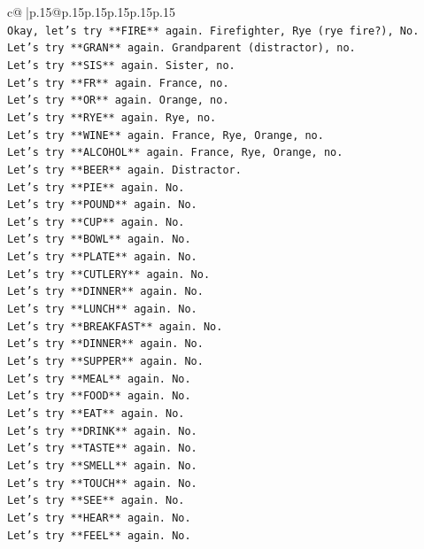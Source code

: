 \documentclass{article}
\begin{document}
{\begin{supertabular}{c@{$\;$}|p{.15\linewidth}@{}p{.15\linewidth}p{.15\linewidth}p{.15\linewidth}p{.15\linewidth}p{.15\linewidth}}
{{{\\ 
\texttt{Okay, let's try **FIRE** again. Firefighter, Rye (rye fire?), No.} \\
\texttt{Let's try **GRAN** again. Grandparent (distractor), no.} \\
\texttt{Let's try **SIS** again. Sister, no.} \\
\texttt{Let's try **FR** again. France, no.} \\
\texttt{Let's try **OR** again. Orange, no.} \\
\texttt{Let's try **RYE** again. Rye, no.} \\
\texttt{Let's try **WINE** again. France, Rye, Orange, no.} \\
\texttt{Let's try **ALCOHOL** again. France, Rye, Orange, no.} \\
\texttt{Let's try **BEER** again. Distractor.} \\
\texttt{Let's try **PIE** again. No.} \\
\texttt{Let's try **POUND** again. No.} \\
\texttt{Let's try **CUP** again. No.} \\
\texttt{Let's try **BOWL** again. No.} \\
\texttt{Let's try **PLATE** again. No.} \\
\texttt{Let's try **CUTLERY** again. No.} \\
\texttt{Let's try **DINNER** again. No.} \\
\texttt{Let's try **LUNCH** again. No.} \\
\texttt{Let's try **BREAKFAST** again. No.} \\
\texttt{Let's try **DINNER** again. No.} \\
\texttt{Let's try **SUPPER** again. No.} \\
\texttt{Let's try **MEAL** again. No.} \\
\texttt{Let's try **FOOD** again. No.} \\
\texttt{Let's try **EAT** again. No.} \\
\texttt{Let's try **DRINK** again. No.} \\
\texttt{Let's try **TASTE** again. No.} \\
\texttt{Let's try **SMELL** again. No.} \\
\texttt{Let's try **TOUCH** again. No.} \\
\texttt{Let's try **SEE** again. No.} \\
\texttt{Let's try **HEAR** again. No.} \\
\texttt{Let's try **FEEL** again. No.} \\
}}}
\end{supertabular}}
\end{document}
